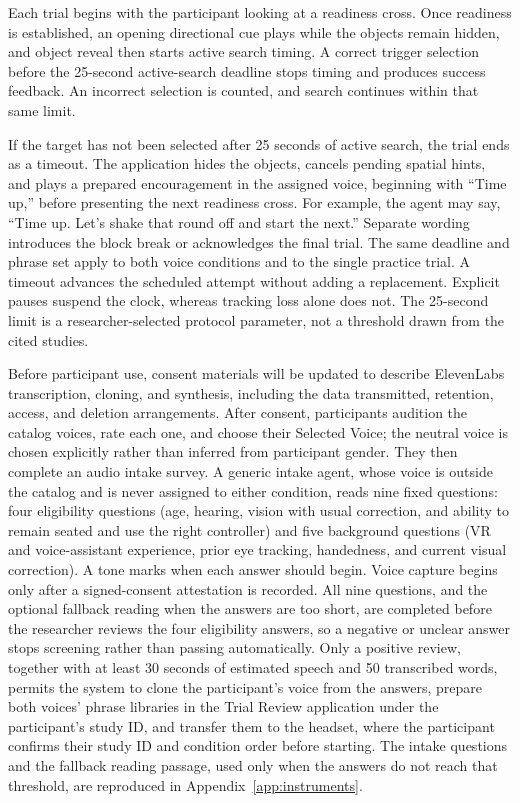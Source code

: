 Each trial begins with the participant looking at a readiness cross. Once readiness is established, an opening directional cue plays while the objects remain hidden, and object reveal then starts active search timing. A correct trigger selection before the 25-second active-search deadline stops timing and produces success feedback. An incorrect selection is counted, and search continues within that same limit.

If the target has not been selected after 25 seconds of active search, the trial ends as a timeout. The application hides the objects, cancels pending spatial hints, and plays a prepared encouragement in the assigned voice, beginning with ``Time up,'' before presenting the next readiness cross. For example, the agent may say, ``Time up. Let's shake that round off and start the next.'' Separate wording introduces the block break or acknowledges the final trial. The same deadline and phrase set apply to both voice conditions and to the single practice trial. A timeout advances the scheduled attempt without adding a replacement. Explicit pauses suspend the clock, whereas tracking loss alone does not. The 25-second limit is a researcher-selected protocol parameter, not a threshold drawn from the cited studies.

Before participant use, consent materials will be updated to describe ElevenLabs transcription, cloning, and synthesis, including the data transmitted, retention, access, and deletion arrangements. After consent, participants audition the catalog voices, rate each one, and choose their Selected Voice; the neutral voice is chosen explicitly rather than inferred from participant gender. They then complete an audio intake survey. A generic intake agent, whose voice is outside the catalog and is never assigned to either condition, reads nine fixed questions: four eligibility questions (age, hearing, vision with usual correction, and ability to remain seated and use the right controller) and five background questions (VR and voice-assistant experience, prior eye tracking, handedness, and current visual correction). A tone marks when each answer should begin. Voice capture begins only after a signed-consent attestation is recorded. All nine questions, and the optional fallback reading when the answers are too short, are completed before the researcher reviews the four eligibility answers, so a negative or unclear answer stops screening rather than passing automatically. Only a positive review, together with at least 30 seconds of estimated speech and 50 transcribed words, permits the system to clone the participant's voice from the answers, prepare both voices' phrase libraries in the Trial Review application under the participant's study ID, and transfer them to the headset, where the participant confirms their study ID and condition order before starting. The intake questions and the fallback reading passage, used only when the answers do not reach that threshold, are reproduced in Appendix~\ref{app:instruments}.


